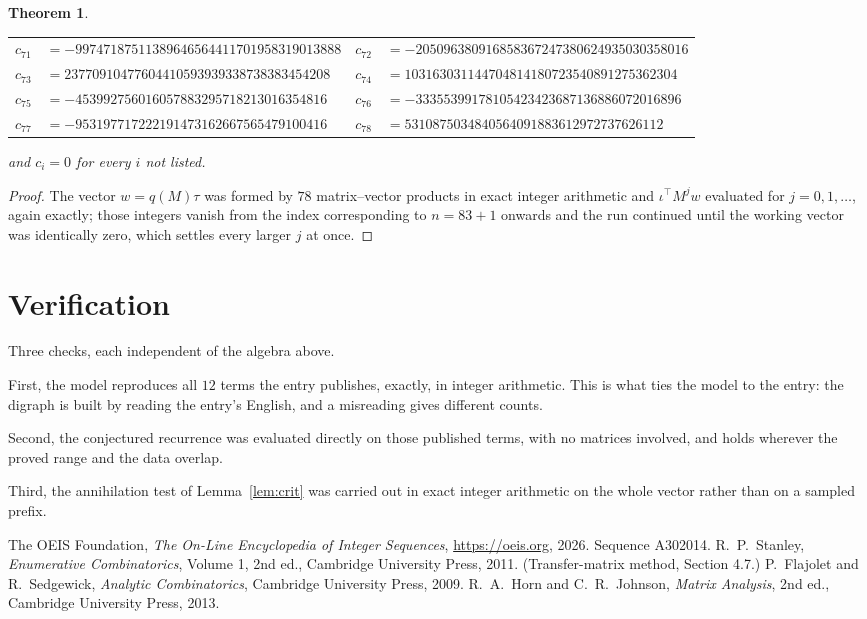 \documentclass[11pt,a4paper]{article}
\theoremstyle{plain}
\newtheorem{theorem}{Theorem}
\theoremstyle{definition}
\begin{document}
\begin{theorem}
\begin{center}
\begin{tabular}{r@{\,}l@{\qquad}r@{\,}l}
$c_{71}$ & $=-99747187511389646564411701958319013888$ & $c_{72}$ & $=-205096380916858367247380624935030358016$ \\
$c_{73}$ & $=23770910477604410593939338738383454208$ & $c_{74}$ & $=103163031144704814180723540891275362304$ \\
$c_{75}$ & $=-453992756016057883295718213016354816$ & $c_{76}$ & $=-33355399178105423423687136886072016896$ \\
$c_{77}$ & $=-953197717222191473162667565479100416$ & $c_{78}$ & $=5310875034840564091883612972737626112$ \\
\end{tabular}
\end{center}
and $c_i=0$ for every $i$ not listed.
\end{theorem}

\begin{proof}
The vector $w=q(M)\tau$ was formed by $78$ matrix--vector products in exact integer
arithmetic and $\iota^{\!\top}M^{j}w$ evaluated for $j=0,1,\dots$, again exactly; those
integers vanish from the index corresponding to $n=83+1$ onwards and the run continued
until the working vector was identically zero, which settles every larger $j$ at once.
\end{proof}

\section{Verification}

Three checks, each independent of the algebra above.

First, the model reproduces all $12$ terms the entry publishes, exactly, in integer
arithmetic. This is what ties the model to the entry: the digraph is built by reading the
entry's English, and a misreading gives different counts.

Second, the conjectured recurrence was evaluated directly on those published terms, with no
matrices involved, and holds wherever the proved range and the data overlap.

Third, the annihilation test of Lemma~\ref{lem:crit} was carried out in exact integer
arithmetic on the whole vector rather than on a sampled prefix.

\begin{thebibliography}{9}
 The OEIS Foundation, \emph{The On-Line Encyclopedia of Integer
Sequences}, \url{https://oeis.org}, 2026. Sequence A302014.
 R.~P.~Stanley, \emph{Enumerative Combinatorics}, Volume 1, 2nd ed.,
Cambridge University Press, 2011. (Transfer-matrix method, Section 4.7.)
 P.~Flajolet and R.~Sedgewick, \emph{Analytic Combinatorics}, Cambridge
University Press, 2009.
 R.~A.~Horn and C.~R.~Johnson, \emph{Matrix Analysis}, 2nd ed., Cambridge
University Press, 2013.
\end{thebibliography}
\end{document}
